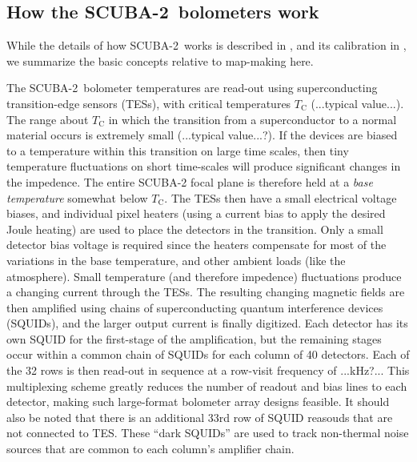 \documentclass[useAMS,usenatbib,nofootinbib]{mn2e}
\newcommand{\scuba}{SCUBA-2}
\begin{document}
\subsection{How the \scuba\ bolometers work}
\label{sec:bolos}

While the details of how \scuba\ works is described in
\citet{holland2011}, and its calibration in \citet{dempsey2011}, we
summarize the basic concepts relative to map-making here.

The \scuba\ bolometer temperatures are read-out using superconducting
transition-edge sensors (TESs), with critical temperatures
$T_\mathrm{C}$ (...typical value...). The range about $T_\mathrm{C}$
in which the transition from a superconductor to a normal material
occurs is extremely small (...typical value...?). If the devices are
biased to a temperature within this transition on large time scales,
then tiny temperature fluctuations on short time-scales will produce
significant changes in the impedence. The entire SCUBA-2 focal plane
is therefore held at a \emph{base temperature} somewhat below
$T_\mathrm{C}$. The TESs then have a small electrical voltage biases,
and individual pixel heaters (using a current bias to apply the
desired Joule heating) are used to place the detectors in the
transition. Only a small detector bias voltage is required since the
heaters compensate for most of the variations in the base temperature,
and other ambient loads (like the atmosphere).  Small temperature (and
therefore impedence) fluctuations produce a changing current through
the TESs. The resulting changing magnetic fields are then amplified
using chains of superconducting quantum interference devices (SQUIDs),
and the larger output current is finally digitized. Each detector has
its own SQUID for the first-stage of the amplification, but the
remaining stages occur within a common chain of SQUIDs for each column
of 40 detectors. Each of the 32 rows is then read-out in sequence at a
row-visit frequency of ...kHz?... This multiplexing scheme greatly
reduces the number of readout and bias lines to each detector, making
such large-format bolometer array designs feasible. It should also be
noted that there is an additional 33rd row of SQUID reasouds that are
not connected to TES. These ``dark SQUIDs'' are used to track
non-thermal noise sources that are common to each column's amplifier
chain.
\end{document}
